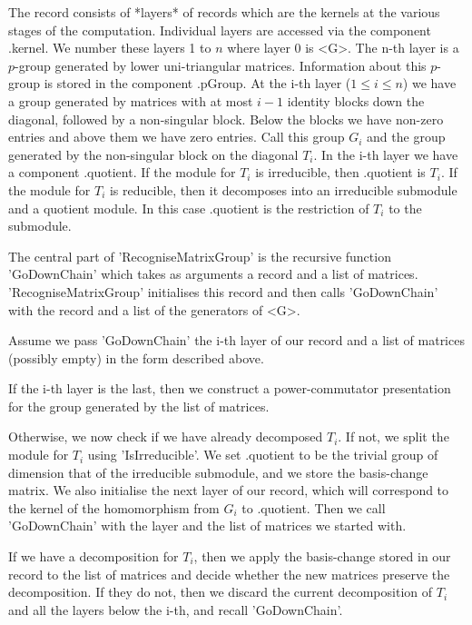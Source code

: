 The record consists  of *layers* of records  which are the kernels at the
various stages of the computation. Individual layers are accessed via the
component  .kernel. We  number these layers  1 to $n$ where  layer 0  is 
<G>. The n-th layer is  a $p$-group   generated by lower  uni-triangular
matrices.  Information  about this $p$-group is   stored in the component
.pGroup. At the i-th layer ($1 \leq i \leq n$) we  have a group generated
by  matrices  with  at  most $i-1$ identity   blocks  down  the diagonal,
followed  by  a non-singular block.   Below the blocks  we  have non-zero
entries and  above them we  have zero entries. Call  this group $G_i$ and
the group generated by the non-singular block on  the diagonal $T_i$.  In
the i-th layer we have a component .quotient. If the  module for $T_i$ is
irreducible,  then .quotient   is $T_i$.  If    the module for $T_i$   is
reducible, then it   decomposes into  an   irreducible submodule and    a
quotient  module. In this  case .quotient is  the restriction of $T_i$ to
the submodule.

The central  part  of  'RecogniseMatrixGroup' is  the  recursive function
'GoDownChain' which takes  as arguments a  record and a list of matrices.
'RecogniseMatrixGroup'   initialises this     record  and    then   calls
'GoDownChain' with the record and a list of the generators of <G>.

Assume we pass 'GoDownChain'  the i-th layer of our  record and a list of
matrices (possibly empty) in the form described above.

If the i-th   layer is the last, then   we  construct a  power-commutator
presentation for the group generated by the list of matrices.

Otherwise, we now check if we have already decomposed  $T_i$.  If not, we
split the module for $T_i$ using 'IsIrreducible'.  We set .quotient to be
the trivial group of dimension that of the  irreducible submodule, and we
store the basis-change  matrix. We also  initialise the next layer of our
record, which  will correspond  to the kernel   of the  homomorphism from
$G_i$ to .quotient.  Then  we call 'GoDownChain'  with the  layer and the
list of matrices we started with.

If we  have a  decomposition for  $T_i$, then we  apply  the basis-change
stored in our record  to the list of  matrices and decide whether the new
matrices preserve the decomposition. If they  do not, then we discard the
current  decomposition of  $T_i$ and all  the layers  below the i-th, and
recall 'GoDownChain'.

